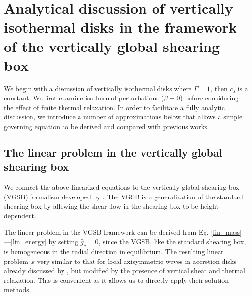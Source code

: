 \section{Analytical discussion of vertically isothermal
  disks in the framework of the vertically global shearing
  box}\label{analytical}  
We begin with a discussion of vertically isothermal disks
where $\Gamma=1$, then $c_s$ is a constant. We  
first examine isothermal perturbations ($\beta = 0$) before
considering the effect of finite thermal relaxation. 
In order to facilitate a fully analytic discussion, we introduce a number
of approximations below that allows a simple governing equation to be
derived and compared with previous works.  

\subsection{The linear problem in the vertically global
  shearing box} 
We connect the above linearized equations to the vertically global
shearing box (VGSB) formalism developed by \cite{mcnally14}. The VGSB
is a generalization of the standard shearing box \citep{goldreich65}
by allowing the shear flow in the shearing box to be height-dependent.    

The linear problem in the VGSB framework can be derived from 
Eq. \ref{lin_mass}---\ref{lin_energy} by setting $\hat{g}_c=0$, since 
the VGSB, like the standard shearing box, is homogeneous in the radial 
direction in equilibrium. The resulting linear problem is very similar
to that for local axisymmetric waves in accretion disks already
discussed by \cite{lubow93}, but modified by the presence of vertical
shear and thermal relaxation. This is convenient as it allows us to
directly apply their solution methods.    


